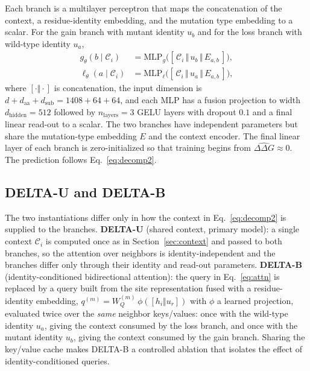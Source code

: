 \documentclass[11pt,a4paper]{article}
\theoremstyle{plain}
\theoremstyle{definition}
\begin{document}
Each branch is a multilayer perceptron that maps the concatenation of the context, a residue-identity embedding, and the mutation type embedding to a scalar. For the gain branch with mutant identity $u_b$ and for the loss
branch with wild-type identity $u_a$,
\begin{align}
g_\theta(b\mid\mathcal{C}_i) &= \mathrm{MLP}_g\big([\,\mathcal{C}_i \,\Vert\, u_b \,\Vert\, E_{a,b}\,]\big), \\
\ell_\theta(a\mid\mathcal{C}_i) &= \mathrm{MLP}_\ell\big([\,\mathcal{C}_i \,\Vert\, u_a \,\Vert\, E_{a,b}\,]\big),
\end{align}
where $[\cdot\Vert\cdot]$ is concatenation, the input dimension is
$d + d_{\mathrm{aa}} + d_{\mathrm{sub}} = 1408 + 64 + 64$, and each MLP has
a fusion projection to width $d_{\mathrm{hidden}} = 512$ followed by
$n_{\mathrm{layers}} = 3$ GELU layers with dropout $0.1$ and a final linear
read-out to a scalar. The two branches have independent parameters but share the mutation-type embedding $E$ and the context encoder. The final linear layer of each branch is zero-initialized so that training begins
from $\widehat{\Delta\Delta G} \approx 0$. The prediction follows
Eq.~\eqref{eq:decomp2}.

\subsection{DELTA-U and DELTA-B}
\label{sec:variants}

The two instantiations differ only in how the context in Eq.~\eqref{eq:decomp2} is supplied to the branches. \textbf{DELTA-U} (shared context, primary model): a single context $\mathcal{C}_i$ is computed once as in Section~\ref{sec:context} and passed to both branches, so the attention over neighbors is identity-independent and the branches differ only through their identity and read-out parameters. \textbf{DELTA-B} (identity-conditioned bidirectional attention): the query in Eq.~\eqref{eq:attn} is replaced by a query built from the site representation fused with a residue-identity embedding, $q^{(m)} = W_Q^{(m)}\,\phi([h_i \Vert u_r])$ with $\phi$ a learned projection, evaluated twice over the \emph{same} neighbor keys/values: once with the wild-type identity $u_a$, giving the context consumed by the loss branch, and once with the mutant identity $u_b$, giving the context consumed by the gain branch. Sharing the key/value cache makes DELTA-B a controlled ablation that isolates the effect of identity-conditioned queries.
\end{document}
